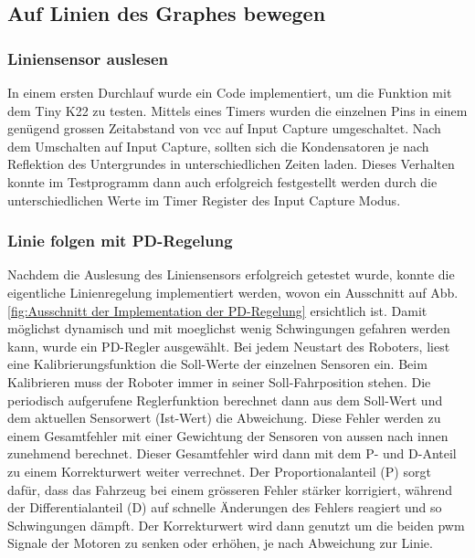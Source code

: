 \subsection{Auf Linien des Graphes bewegen}

\subsubsection{Liniensensor auslesen}
\label{Liniensensor auslesen}

In einem ersten Durchlauf wurde ein Code implementiert, um die Funktion mit dem Tiny K22 zu testen. Mittels eines Timers wurden die einzelnen Pins in einem genügend grossen Zeitabstand von \acrfull{vcc} auf Input Capture umgeschaltet. Nach dem Umschalten auf Input Capture, sollten sich die Kondensatoren je nach Reflektion des Untergrundes in unterschiedlichen Zeiten laden. Dieses Verhalten konnte im Testprogramm dann auch erfolgreich festgestellt werden durch die unterschiedlichen Werte im Timer Register des Input Capture Modus.


\subsubsection{Linie folgen mit PD-Regelung}

Nachdem die Auslesung des Liniensensors erfolgreich getestet wurde, konnte die eigentliche Linienregelung implementiert werden, wovon ein Ausschnitt auf Abb. \ref{fig:Ausschnitt der Implementation der PD-Regelung} ersichtlich ist. Damit möglichst dynamisch und mit moeglichst wenig Schwingungen gefahren werden kann, wurde ein PD-Regler ausgewählt. Bei jedem Neustart des Roboters, liest eine Kalibrierungsfunktion die Soll-Werte der einzelnen Sensoren ein. Beim Kalibrieren muss der Roboter immer in seiner Soll-Fahrposition stehen. Die periodisch aufgerufene Reglerfunktion berechnet dann aus dem Soll-Wert und dem aktuellen Sensorwert (Ist-Wert) die Abweichung. Diese Fehler werden zu einem Gesamtfehler mit einer Gewichtung der Sensoren von aussen nach innen zunehmend berechnet. Dieser Gesamtfehler wird dann mit dem P- und D-Anteil zu einem Korrekturwert weiter verrechnet. Der Proportionalanteil (P) sorgt dafür, dass das Fahrzeug bei einem grösseren Fehler stärker korrigiert, während der Differentialanteil (D) auf schnelle Änderungen des Fehlers reagiert und so Schwingungen dämpft. Der Korrekturwert wird dann genutzt um die beiden \acrfull{pwm} Signale der Motoren zu senken oder erhöhen, je nach Abweichung zur Linie.

